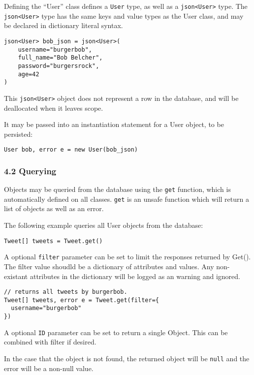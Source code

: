 Defining the ``User'' class defines a \texttt{User} type, as well as a
\texttt{json\textless{}User\textgreater{}} type. The
\texttt{json\textless{}User\textgreater{}} type has the same keys and
value types as the User class, and may be declared in dictionary literal
syntax.

\begin{verbatim}
json<User> bob_json = json<User>(
    username="burgerbob",
    full_name="Bob Belcher",
    password="burgersrock",
    age=42
)
\end{verbatim}

This \texttt{json\textless{}User\textgreater{}} object does not
represent a row in the database, and will be deallocated when it leaves
scope.

It may be passed into an instantiation statement for a User object, to
be persisted:

\begin{verbatim}
User bob, error e = new User(bob_json)
\end{verbatim}

\subsubsection*{4.2 Querying}\label{querying}

Objects may be queried from the database using the \texttt{get}
function, which is automatically defined on all classes. \texttt{get} is
an unsafe function which will return a list of objects as well as an
error.

The following example queries all User objects from the database:

\begin{verbatim}
Tweet[] tweets = Tweet.get()
\end{verbatim}

A optional \texttt{filter} parameter can be set to limit the responses
returned by Get(). The filter value shoudld be a dictionary of
attributes and values. Any non-existant attributes in the dictionary
will be logged as an warning and ignored.

\begin{verbatim}
// returns all tweets by burgerbob.
Tweet[] tweets, error e = Tweet.get(filter={
  username="burgerbob"
})
\end{verbatim}

A optional \texttt{ID} parameter can be set to return a single Object.
This can be combined with filter if desired.

In the case that the object is not found, the returned object will be
\texttt{null} and the error will be a non-null value.

